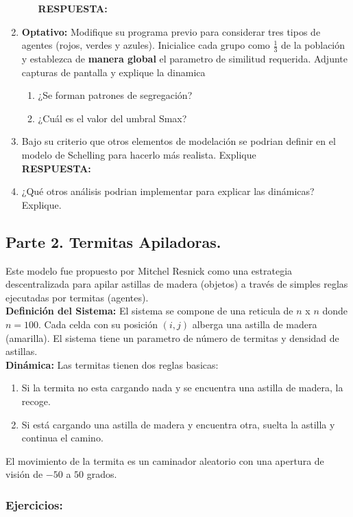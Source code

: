 \documentclass[12pt]{article}
\begin{document}
\begin{enumerate}
\begin{enumerate}
        \textbf{\color{red} RESPUESTA:}\\
    \end{enumerate}
    \item \textbf{Optativo:} Modifique su programa previo para considerar tres tipos de agentes (rojos, verdes y azules). Inicialice cada grupo como $\frac{1}{3}$ de la población y establezca de \textbf{manera global}
    el parametro de similitud requerida. Adjunte capturas de pantalla y explique la dinamica\\
    \begin{enumerate}
        \item ¿Se forman patrones de segregación?
        \item ¿Cuál es el valor del umbral Smax? 
    \end{enumerate}
    \item Bajo su criterio que otros elementos de modelación se podrian definir en el modelo de Schelling para hacerlo más realista. Explique\\
    \textbf{\color{red} RESPUESTA:}\\
    \item ¿Qué otros análisis podrian implementar para explicar las dinámicas? Explique.
\end{enumerate}

{\color{blue} \subsection*{Parte 2. Termitas Apiladoras.}}
\vspace{1em}

Este modelo fue propuesto por Mitchel Resnick como una estrategia descentralizada para apilar astillas de madera (objetos) a través de simples reglas ejecutadas por termitas (agentes).\\

\textbf{Definición del Sistema:} El sistema se compone de una reticula de $n$ x $n$ donde $n=100$. Cada celda con su posición $(i,j)$ alberga una astilla de madera (amarilla). El sistema tiene un parametro de número de termitas y densidad de astillas.\\

\textbf{Dinámica:} Las termitas tienen dos reglas basicas:\\
\begin{enumerate}
    \item Si la termita no esta cargando nada y se encuentra una astilla de madera, la recoge.
    \item Si está cargando una astilla de madera y encuentra otra, suelta la astilla y continua el camino.
\end{enumerate}
El movimiento  de la termita es un caminador aleatorio con una apertura de visión de $-50$ a $50$ grados.\\ 
{\color{blue} \subsubsection*{Ejercicios:}}
\end{document}
